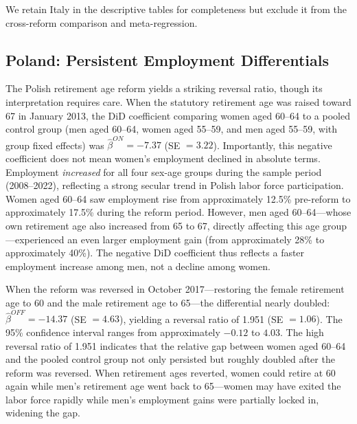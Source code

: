 \documentclass[12pt]{article}
\begin{document}
We retain Italy in the descriptive tables for completeness but exclude it from the cross-reform comparison and meta-regression.

\subsection{Poland: Persistent Employment Differentials}

The Polish retirement age reform yields a striking reversal ratio, though its interpretation requires care. When the statutory retirement age was raised toward 67 in January 2013, the DiD coefficient comparing women aged 60--64 to a pooled control group (men aged 60--64, women aged 55--59, and men aged 55--59, with group fixed effects) was $\hat{\beta}^{ON} = -7.37$ (SE $= 3.22$). Importantly, this negative coefficient does not mean women's employment declined in absolute terms. Employment \textit{increased} for all four sex-age groups during the sample period (2008--2022), reflecting a strong secular trend in Polish labor force participation. Women aged 60--64 saw employment rise from approximately 12.5\% pre-reform to approximately 17.5\% during the reform period. However, men aged 60--64---whose own retirement age also increased from 65 to 67, directly affecting this age group---experienced an even larger employment gain (from approximately 28\% to approximately 40\%). The negative DiD coefficient thus reflects a faster employment increase among men, not a decline among women.

When the reform was reversed in October 2017---restoring the female retirement age to 60 and the male retirement age to 65---the differential nearly doubled: $\hat{\beta}^{OFF} = -14.37$ (SE $= 4.63$), yielding a reversal ratio of 1.951 (SE $= 1.06$). The 95\% confidence interval ranges from approximately $-0.12$ to $4.03$. The high reversal ratio of 1.951 indicates that the relative gap between women aged 60--64 and the pooled control group not only persisted but roughly doubled after the reform was reversed. When retirement ages reverted, women could retire at 60 again while men's retirement age went back to 65---women may have exited the labor force rapidly while men's employment gains were partially locked in, widening the gap.
\end{document}
